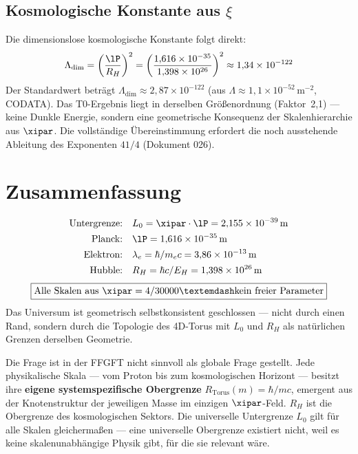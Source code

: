 \subsection{Kosmologische Konstante aus \texorpdfstring{$\xi$}{xi}}

Die dimensionslose kosmologische Konstante folgt direkt:
\begin{equation}
	\Lambda_{\text{dim}} = \left(\frac{\lP}{R_H}\right)^2 = \left(\frac{1{,}616 \times 10^{-35}}{1{,}398 \times 10^{26}}\right)^2 \approx 1{,}34 \times 10^{-122}
\end{equation}
Der Standardwert beträgt $\Lambda_{\text{dim}} \approx 2{,}87 \times 10^{-122}$ (aus $\Lambda \approx 1{,}1 \times 10^{-52}\,\text{m}^{-2}$, CODATA). Das T0-Ergebnis liegt in derselben Größenordnung (Faktor~2{,}1) — keine Dunkle Energie, sondern eine geometrische Konsequenz der Skalenhierarchie aus $\xipar$. Die vollständige Übereinstimmung erfordert die noch ausstehende Ableitung des Exponenten $41/4$ (Dokument 026).

\section{Zusammenfassung}

\begin{keyresult}[Vollständige Skalenhierarchie aus \texorpdfstring{$\xipar = 4/30000$}{xi = 4/30000}]
\begin{align}
	\text{Untergrenze:} \quad & L_0 = \xipar \cdot \lP = 2{,}155 \times 10^{-39}\,\text{m} \notag \\
	\text{Planck:} \quad & \lP = 1{,}616 \times 10^{-35}\,\text{m} \notag \\
	\text{Elektron:} \quad & \lambda_e = \hbar/m_e c = 3{,}86 \times 10^{-13}\,\text{m} \notag \\
	\text{Hubble:} \quad & R_H = \hbar c/E_H = 1{,}398 \times 10^{26}\,\text{m} \notag
\end{align}
\begin{equation}
	\boxed{\text{Alle Skalen aus } \xipar = 4/30000 — \text{kein freier Parameter}}
\end{equation}
Das Universum ist geometrisch selbstkonsistent geschlossen — nicht durch einen Rand, sondern durch die Topologie des 4D-Torus mit $L_0$ und $R_H$ als natürlichen Grenzen derselben Geometrie.

\begin{keyresult}
Die Frage ist in der FFGFT nicht sinnvoll als globale Frage gestellt. Jede physikalische Skala — vom Proton bis zum kosmologischen Horizont — besitzt ihre \textbf{eigene systemspezifische Obergrenze} $R_\text{Torus}(m) = \hbar/mc$, emergent aus der Knotenstruktur der jeweiligen Masse im einzigen $\xipar$-Feld. $R_H$ ist die Obergrenze des kosmologischen Sektors. Die universelle Untergrenze $L_0$ gilt für alle Skalen gleichermaßen — eine universelle Obergrenze existiert nicht, weil es keine skalenunabhängige Physik gibt, für die sie relevant wäre.
\end{keyresult}
\end{keyresult}


